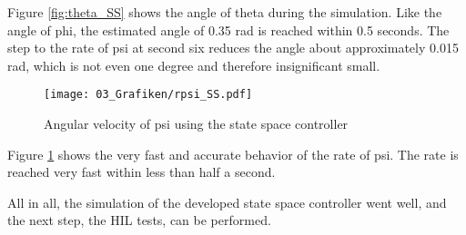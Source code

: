 Figure \ref{fig:theta_SS} shows the angle of theta during the simulation. Like the angle of phi, the estimated angle of 0.35 rad is reached within 0.5 seconds. The step to the rate of psi at second six reduces the angle about approximately 0.015 rad, which is not even one degree and therefore insignificant small.

\begin{figure}
	\centering
		\texttt{[image: 03\_Grafiken/rpsi\_SS.pdf]}
	\caption{Angular velocity of psi using the state space controller}
	\label{fig:rpsi_SS}
\end{figure}

Figure \ref{fig:rpsi_SS} shows the very fast and accurate behavior of the rate of psi. The rate is reached very fast within less than half a second.


All in all, the simulation of the developed state space controller went well, and the next step, the HIL tests, can be performed.